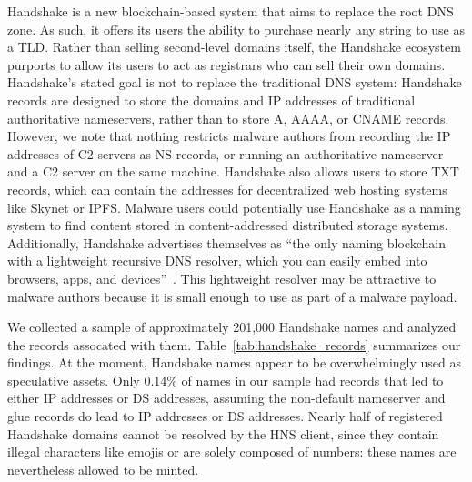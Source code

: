 \documentclass[10pt,sigconf,letterpaper]{acmart}
\begin{document}
Handshake is a new blockchain-based system that aims to 
replace the root DNS 
zone. As such, it offers its users the ability to purchase 
nearly any string to 
use as a TLD. Rather than selling second-level domains 
itself, the Handshake ecosystem purports to allow its users 
to act as registrars who can sell their own domains. 
Handshake's stated goal is not to replace the traditional DNS 
system: Handshake records are designed to store the domains 
and IP addresses of traditional authoritative nameservers, 
rather than to store A, AAAA, or CNAME records. However, we note that nothing 
restricts malware authors from recording the IP addresses of C2 servers as NS 
records, or running an authoritative nameserver and a C2 server on the same 
machine. Handshake also allows users to store TXT records, which can 
contain the addresses for decentralized web hosting systems 
like Skynet or IPFS. Malware users could potentially use 
Handshake as a naming system to find content stored in 
content-addressed distributed storage systems. Additionally, Handshake 
advertises themselves as ``the only naming blockchain with a lightweight 
recursive DNS resolver, which you can easily embed into 
browsers, apps, and devices''~\cite{namebase_access_handshake}. 
This lightweight resolver may be attractive to malware authors because it is 
small enough to use as part of a malware payload.

We collected a sample of approximately 201,000 Handshake names and analyzed the 
records assocated with them. Table~\ref{tab:handshake_records} 
summarizes our findings. At the moment, Handshake names appear to be 
overwhelmingly used as speculative assets. Only 0.14\% of names in our sample 
had records that led to either IP addresses or DS addresses, assuming the 
non-default nameserver and glue records do lead to IP addresses or DS 
addresses. Nearly half of registered Handshake domains cannot be resolved by 
the HNS client, since they contain illegal characters like emojis or are solely 
composed of numbers: these names are nevertheless allowed to be minted.

\end{document}
